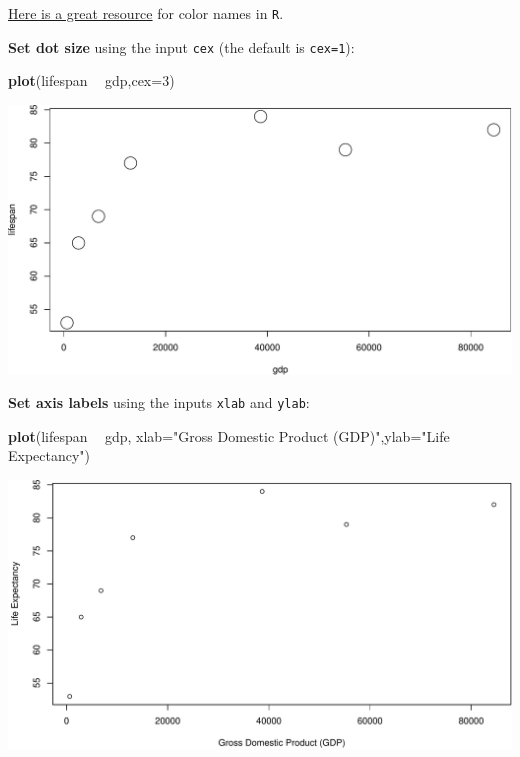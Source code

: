 \documentclass[]{book}
\newenvironment{Shaded}{\begin{snugshade}}{\end{snugshade}}
\newcommand{\DataTypeTok}[1]{\textcolor[rgb]{0.13,0.29,0.53}{#1}}
\newcommand{\DecValTok}[1]{\textcolor[rgb]{0.00,0.00,0.81}{#1}}
\newcommand{\KeywordTok}[1]{\textcolor[rgb]{0.13,0.29,0.53}{\textbf{#1}}}
\newcommand{\NormalTok}[1]{#1}
\newcommand{\OperatorTok}[1]{\textcolor[rgb]{0.81,0.36,0.00}{\textbf{#1}}}
\newcommand{\StringTok}[1]{\textcolor[rgb]{0.31,0.60,0.02}{#1}}
\begin{document}
\href{http://www.stat.columbia.edu/~tzheng/files/Rcolor.pdf?utm_source=twitterfeed\&utm_medium=twitter}{Here is a great resource} for color names in \texttt{R}.

\textbf{Set dot size} using the input \texttt{cex} (the default is \texttt{cex=1}):

\begin{Shaded}
\begin{Highlighting}[]
\KeywordTok{plot}\NormalTok{(lifespan }\OperatorTok{~}\StringTok{ }\NormalTok{gdp,}\DataTypeTok{cex=}\DecValTok{3}\NormalTok{)}
\end{Highlighting}
\end{Shaded}

\includegraphics{figures/unnamed-chunk-231-1.pdf}

\textbf{Set axis labels} using the inputs \texttt{xlab} and \texttt{ylab}:

\begin{Shaded}
\begin{Highlighting}[]
\KeywordTok{plot}\NormalTok{(lifespan }\OperatorTok{~}\StringTok{ }\NormalTok{gdp, }\DataTypeTok{xlab=}\StringTok{"Gross Domestic Product (GDP)"}\NormalTok{,}\DataTypeTok{ylab=}\StringTok{"Life Expectancy"}\NormalTok{)}
\end{Highlighting}
\end{Shaded}

\includegraphics{figures/unnamed-chunk-232-1.pdf}
\end{document}
